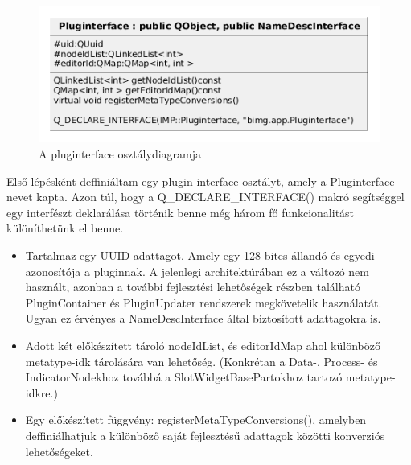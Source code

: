 \documentclass[a4paper,12pt,oneside]{report}
\begin{document}
\begin{center}
\begin{figure}[h]
  \includegraphics[width=1\textwidth]{pluginterface_diag.png}
  \caption{A pluginterface osztálydiagramja }

  \label{fig:bimg_slot_diag}
\end{figure}
\end{center}
Első lépésként deffiniáltam egy plugin interface osztályt, amely a Pluginterface nevet kapta. Azon túl, hogy a Q\_DECLARE\_INTERFACE() makró segítséggel egy interfészt deklarálása történik benne még három fő funkcionalitást különíthetünk el benne.
			\begin{itemize}
			\itemsep0em
			\item Tartalmaz egy UUID\cite{website:uuid_site} adattagot. Amely egy 128 bites állandó és egyedi azonosítója a pluginnak. A jelenlegi architektúrában ez a változó nem használt, azonban a további fejlesztési lehetőségek részben található PluginContainer és PluginUpdater rendszerek megkövetelik használatát. Ugyan ez érvényes a NameDescInterface által biztosított adattagokra is.
			\item Adott két előkészített tároló nodeIdList, és editorIdMap ahol különböző metatype-idk tárolására van lehetőség. (Konkrétan a Data-, Process- és IndicatorNodekhoz továbbá a SlotWidgetBasePartokhoz tartozó metatype-idkre.)
			\item Egy előkészített függvény: registerMetaTypeConversions(), amelyben deffiniálhatjuk a különböző saját fejlesztésű adattagok közötti konverziós lehetőségeket. 
		\end{itemize}
\end{document}
